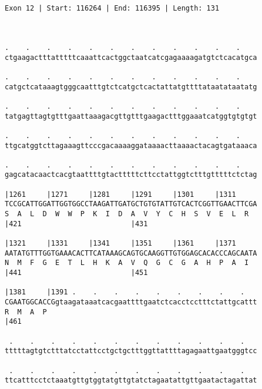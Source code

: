 \documentclass{article}
\begin{document}
\begin{Verbatim}
               
 
Exon 12 | Start: 116264 | End: 116395 | Length: 131



.    .    .    .    .    .    .    .    .    .    .    .    
ctgaagactttatttttcaaattcactggctaatcatcgagaaaagatgtctcacatgca
                                                            
.    .    .    .    .    .    .    .    .    .    .    .    
catgctcataaagtgggcaatttgtctcatgctcactattatgttttataatataatatg
                                                            
.    .    .    .    .    .    .    .    .    .    .    .    
tatgagttagtgtttgaattaaagacgttgtttgaagactttggaaatcatggtgtgtgt
                                                            
.    .    .    .    .    .    .    .    .    .    .    .    
ttgcatggtcttagaaagttcccgacaaaaggataaaacttaaaactacagtgataaaca
                                                            
.    .    .    .    .    .    .    .    .    .    .    .    
gagcatacaactcacgtaattttgtactttttcttcctattggtctttgtttttctctag
                                                            
|1261     |1271     |1281     |1291     |1301     |1311     
TCCGCATTGGATTGGTGGCCTAAGATTGATGCTGTGTATTGTCACTCGGTTGAACTTCGA
S  A  L  D  W  W  P  K  I  D  A  V  Y  C  H  S  V  E  L  R  
|421                          |431                          
  
|1321     |1331     |1341     |1351     |1361     |1371     
AATATGTTTGGTGAAACACTTCATAAAGCAGTGCAAGGTTGTGGAGCACACCCAGCAATA
N  M  F  G  E  T  L  H  K  A  V  Q  G  C  G  A  H  P  A  I  
|441                          |451                          
  
|1381     |1391 .    .    .    .    .    .    .    .    .   
CGAATGGCACCGgtaagataaatcacgaattttgaatctcacctcctttctattgcattt
R  M  A  P                                                  
|461                                                        
  
 .    .    .    .    .    .    .    .    .    .    .    .   
tttttagtgtctttatcctattcctgctgctttggttattttagagaattgaatgggtcc
                                                            
 .    .    .    .    .    .    .    .    .    .    .    .   
ttcatttcctctaaatgttgtggtatgttgtatctagaatattgttgaatactagattat
                                                            

\end{Verbatim}
\end{document}
